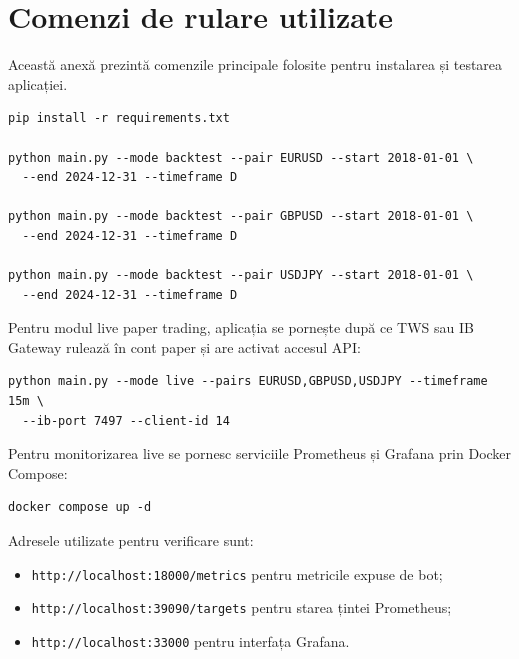 
\section{Comenzi de rulare utilizate}
\label{anexa:comenzi}

Această anexă prezintă comenzile principale folosite pentru instalarea și testarea aplicației.

\begin{code}
\begin{verbatim}
pip install -r requirements.txt

python main.py --mode backtest --pair EURUSD --start 2018-01-01 \
  --end 2024-12-31 --timeframe D

python main.py --mode backtest --pair GBPUSD --start 2018-01-01 \
  --end 2024-12-31 --timeframe D

python main.py --mode backtest --pair USDJPY --start 2018-01-01 \
  --end 2024-12-31 --timeframe D
\end{verbatim}
\caption{Comenzi pentru instalare și backtesting}
\label{code:anexa_backtest_commands}
\end{code}

Pentru modul live paper trading, aplicația se pornește după ce TWS sau IB Gateway rulează în cont paper și are activat accesul API:

\begin{code}
\begin{verbatim}
python main.py --mode live --pairs EURUSD,GBPUSD,USDJPY --timeframe 15m \
  --ib-port 7497 --client-id 14
\end{verbatim}
\caption{Comandă pentru rularea în mod live paper}
\label{code:anexa_live_command}
\end{code}

Pentru monitorizarea live se pornesc serviciile Prometheus și Grafana prin Docker Compose:

\begin{code}
\begin{verbatim}
docker compose up -d
\end{verbatim}
\caption{Pornirea serviciilor de observabilitate}
\label{code:anexa_observability_start}
\end{code}

Adresele utilizate pentru verificare sunt:
\begin{itemize}
    \item \texttt{http://localhost:18000/metrics} pentru metricile expuse de bot;
    \item \texttt{http://localhost:39090/targets} pentru starea țintei Prometheus;
    \item \texttt{http://localhost:33000} pentru interfața Grafana.
\end{itemize}

